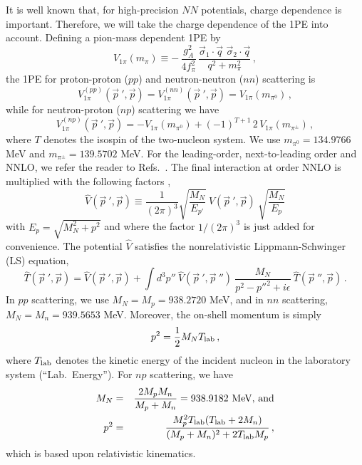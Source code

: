 \documentclass[aps,showpacs,floatfix,nofootinbib,preprintnumbers,superscriptaddress,amsmath,amssymb]{revtex4-1}
\begin{document}
It is well known that, for high-precision $NN$ potentials,
charge dependence is important.
Therefore, we will 
take the charge dependence of the 1PE into account.
Defining a pion-mass dependent 1PE by
\[
V_{1\pi} (m_\pi) \equiv - \,
\frac{g_A^2}{4f_\pi^2} \,
\frac{
\vec \sigma_1 \cdot \vec q \,\, \vec \sigma_2 \cdot \vec q}
{q^2 + m_\pi^2} 
\,,
\]
the 1PE for proton-proton ($pp$) and neutron-neutron ($nn$)
scattering is
\[
V_{1\pi}^{(pp)} ({\vec p}~', \vec p) = 
V_{1\pi}^{(nn)} ({\vec p}~', \vec p) =
V_{1\pi} (m_{\pi^0}) \,,
\]
while for neutron-proton ($np$) scattering we have
\[
V_{1\pi}^{(np)} ({\vec p}~', \vec p) 
= -V_{1\pi} (m_{\pi^0}) + (-1)^{T+1}\, 2\, V_{1\pi} (m_{\pi^\pm})
\,,
\]
where $T$ denotes the isospin of the two-nucleon system.
We use $m_{\pi^0}=134.9766$ MeV and
 $m_{\pi^\pm}=139.5702$ MeV.
For the leading-order, next-to-leading order and NNLO, we refer the reader to Refs.~\cite{machleidt2011,carlsson2014}.
The final interaction at order NNLO is multiplied with the following factors \cite{machleidt2011},
\begin{equation}
\widehat{V}({\vec p}~',{\vec p})
\equiv 
\frac{1}{(2\pi)^3}
\sqrt{\frac{M_N}{E_{p'}}}\:  
{V}({\vec p}~',{\vec p})\:
 \sqrt{\frac{M_N}{E_{p}}}
\label{eq_minrel1}
\end{equation}
with $E_p=\sqrt{M_N^2+p^2}$ and
where the factor $1/(2\pi)^3$ is just added for convenience.
The potential $\widehat{V}$ satisfies the nonrelativistic
Lippmann-Schwinger (LS) equation,
\begin{equation}
 \widehat{T}({\vec p}~',{\vec p})= \widehat{V}({\vec p}~',{\vec p})+
\int d^3p''\:
\widehat{V}({\vec p}~',{\vec p}~'')\:
\frac{M_N}
{{ p}^{2}-{p''}^{2}+i\epsilon}\:
\widehat{T}({\vec p}~'',{\vec p}) \, .
\label{eq_LS}
\end{equation}
In $pp$ scattering, we use $M_N=M_p=938.2720$ MeV,
and in $nn$ scattering, $M_N=M_n=939.5653$ MeV.
Moreover, the on-shell momentum is simply
\begin{equation}
p^2  =  \frac12 M_N T_{\rm lab} \,,
\end{equation}
where $T_{\rm lab}$ denotes 
the kinetic energy of the incident nucleon 
in the laboratory system (``Lab.\ Energy'').
For $np$ scattering, we have
\begin{eqnarray}
M_N  &=&  \frac{2M_pM_n}{M_p+M_n} = 938.9182 \mbox{ MeV, and}
\\
p^2 & = & \frac{M_p^2 T_{\rm lab} (T_{\rm lab} + 2M_n)}
               {(M_p + M_n)^2 + 2T_{\rm lab} M_p}  
\,,
\end{eqnarray}
which is based upon relativistic kinematics.
\end{document}
